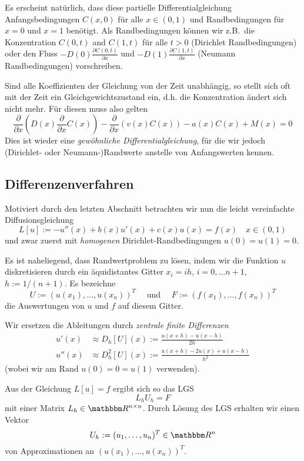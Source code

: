 \documentclass[12pt,a4paper]{book}
\theoremstyle{break}
\theoremstyle{nonumberplain}
\newcommand{\R}{\mathbbm R}
\newcommand{\1}{\mathbbm{1}} 			      	%
\begin{document}
Es erscheint natürlich, dass diese partielle Differentialgleichung Anfangsbedingungen 
$C(x,0)$ für alle $x\in (0,1)$ und Randbedingungen für $x=0$ und $x=1$ benötigt. 
Als Randbedingungen können wir z.B.\ die Konzentration $C(0,t)$ and $C(1,t)$ für alle $t>0$
(Dirichlet Randbedingungen) oder den Fluss  $-D(0)\frac{\partial C(0,t)}{\partial x}$ und $-D(1)\frac{\partial C(1,t)}{\partial x}$ (Neumann Randbedingungen) vorschreiben.

Sind alle Koeffizienten der Gleichung von der Zeit unabhängig, so stellt sich oft 
mit der Zeit ein Gleichgewichtszustand ein, d.h. die Konzentration ändert sich nicht mehr.
Für diesen muss also gelten 
\[
\frac{\partial}{\partial x} \left( D(x) \frac{\partial}{\partial x} C(x)\right) - \frac{\partial}{\partial x} (v(x) C(x)) - a(x)C(x) + M(x)=0
\]
Dies ist wieder eine \emph{gewöhnliche Differentialgleichung}, für die wir jedoch 
(Dirichlet- oder Neumann-)Randwerte anstelle von Anfangswerten kennen.

\subsection{Differenzenverfahren}\label{subsect:FD_1D_BVP}

Motiviert durch den letzten Abschnitt betrachten wir nun
die leicht vereinfachte Diffusionsgleichung
\[
L[u]:=-u''(x) + b(x)u'(x) + c(x)u(x)=f(x) \quad x\in (0,1)
\]
und zwar zuerst mit \emph{homogenen} Dirichlet-Randbedingungen $u(0)=u(1)=0$. 

Es ist naheliegend, dass Randwertproblem zu lösen, indem wir die Funktion
$u$ diskretisieren durch ein äquidistantes Gitter $x_i=ih$, $i=0,\ldots n+1$, $h:=1/(n+1)$. 
Es bezeichne
\[
U:=(u(x_1),\ldots,u(x_{n}))^T\quad \mbox{ und } \quad F:=(f(x_1),\ldots,f(x_{n}))^T
\]
die Auswertungen von $u$ und $f$ auf diesem Gitter.

Wir ersetzen die Ableitungen durch \emph{zentrale finite Differenzen}
\begin{align*}
u'(x) &\approx D_h[U](x):=\frac{u(x+h)-u(x-h)}{2h}\\
u''(x)& \approx D^2_h[U](x):= \frac{u(x+h)-2u(x)+u(x-h)}{h^2}
\end{align*}
(wobei wir am Rand $u(0)=0=u(1)$ verwenden).

Aus der Gleichung $L[u]=f$ ergibt sich so das LGS
\[
L_h U_h = F
\]
mit einer Matrix $L_h\in \R^{n \times n}$. Durch Lösung des LGS erhalten wir einen Vektor
\[
U_h:=(u_1,\ldots, u_{n})^T\in \R^n
\]
von Approximationen an $(u(x_1),\ldots,u(x_{n}))^T$.
\end{document}
